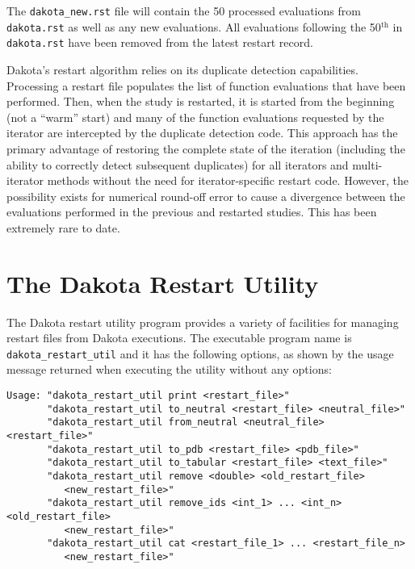 The \texttt{dakota\_new.rst} file will contain the 50 processed
evaluations from \texttt{dakota.rst} as well as any new evaluations.
All evaluations following the 50$^{\mathrm{th}}$ in \texttt{dakota.rst}
have been removed from the latest restart record.

Dakota's restart algorithm relies on its duplicate detection
capabilities. Processing a restart file populates the list of function
evaluations that have been performed. Then, when the study is
restarted, it is started from the beginning (not a ``warm'' start) and
many of the function evaluations requested by the iterator are
intercepted by the duplicate detection code. This approach has the
primary advantage of restoring the complete state of the iteration
(including the ability to correctly detect subsequent duplicates) for
all iterators and multi-iterator methods without the need for
iterator-specific restart code. However, the possibility exists for
numerical round-off error to cause a divergence between the
evaluations performed in the previous and restarted studies. This has
been extremely rare to date.

\section{The Dakota Restart Utility}\label{restart:utility}

The Dakota restart utility program provides a variety of facilities
for managing restart files from Dakota executions. The executable
program name is \texttt{dakota\_restart\_util} and it has the
following options, as shown by the usage message returned when
executing the utility without any options:
\begin{small}
\begin{verbatim}
Usage: "dakota_restart_util print <restart_file>"
       "dakota_restart_util to_neutral <restart_file> <neutral_file>"
       "dakota_restart_util from_neutral <neutral_file> <restart_file>"
       "dakota_restart_util to_pdb <restart_file> <pdb_file>"
       "dakota_restart_util to_tabular <restart_file> <text_file>"
       "dakota_restart_util remove <double> <old_restart_file>
          <new_restart_file>"
       "dakota_restart_util remove_ids <int_1> ... <int_n> <old_restart_file>
          <new_restart_file>"
       "dakota_restart_util cat <restart_file_1> ... <restart_file_n>
          <new_restart_file>"
\end{verbatim}
\end{small}

